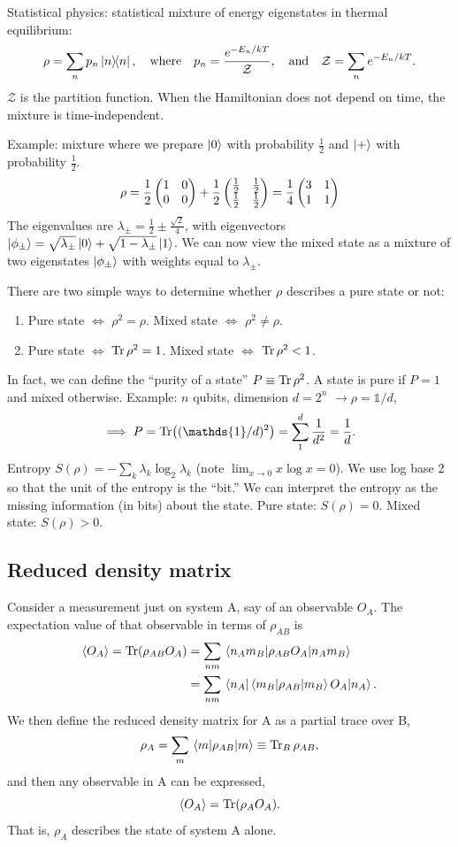 \documentclass[12pt]{article}
\newcommand*\id{\mathds{1}}
\begin{document}
Statistical physics: statistical mixture of energy eigenstates in thermal
equilibrium:
\[\rho = \sum_np_n\ketbra{n}, \qq{where}
p_n = \frac{e^{-E_n/kT}}{\mathcal{Z}}, \qq{and}
\mathcal{Z} = \sum_ne^{-E_n/kT}.\]
$\mathcal{Z}$ is the partition function. When the Hamiltonian does not depend
on time, the mixture is time-independent.

Example: mixture where we prepare $\ket{0}$ with probability $\frac{1}{2}$ and
$\ket{+}$ with probability $\frac{1}{2}$.
\[\rho = \frac{1}{2}\pmqty{1&0\\0&0}
+ \frac{1}{2}\pmqty{\frac{1}{2}&\frac{1}{2}\\\frac{1}{2}&\frac{1}{2}}
= \frac{1}{4}\pmqty{3&1\\1&1}\]
The eigenvalues are $\lambda_\pm = \frac{1}{2} \pm \frac{\sqrt{2}}{4}$, with
eigenvectors $\ket{\phi_\pm} = \sqrt{\lambda_\pm}\ket{0} +
\sqrt{1-\lambda_\pm}\ket{1}$. We can now view the mixed state as a mixture of
two eigenstates $\ket{\phi_\pm}$ with weights equal to $\lambda_\pm$.

There are two simple ways to determine whether $\rho$ describes a pure state
or not:
\begin{enumerate}
    \item Pure state $\Leftrightarrow$ $\rho^2 = \rho$.
        Mixed state $\Leftrightarrow$ $\rho^2 \neq \rho$.
    \item Pure state $\Leftrightarrow$ $\Tr\rho^2 = 1$.
        Mixed state $\Leftrightarrow$ $\Tr\rho^2 < 1$.
\end{enumerate}
In fact, we can define the ``purity of a state'' $P \equiv \Tr\rho^2$. A state
is pure if $P=1$ and mixed otherwise. Example: $n$ qubits, dimension $d = 2^n$
$\rightarrow \rho = \id/d$,
\[\implies P = \Tr((\id/d)^2) = \sum_{1}^d \frac{1}{d^2} = \frac{1}{d}.\]
Entropy $S(\rho) = -\sum_k \lambda_k\log_2\lambda_k$ (note $\lim_{x\rightarrow
0} x\log x = 0$). We use log base 2 so that the unit of the entropy is the
``bit.'' We can interpret the entropy as the missing information (in bits)
about the state. Pure state: $S(\rho) = 0$. Mixed state: $S(\rho) > 0$.

\subsection{Reduced density matrix}
Consider a measurement just on system A, say of an observable $O_A$. The
expectation value of that observable in terms of $\rho_{AB}$ is
\begin{align}
    \ev{O_A} = \Tr(\rho_{AB}O_A) &= \sum_{nm} \ev{\rho_{AB}O_A}{n_Am_B} \\
    &= \sum_{nm} \ev{\ev{\rho_{AB}}{m_B}O_A}{n_A}.
\end{align}
We then define the reduced density matrix for A as a partial trace over B,
\[\rho_A = \sum_m \ev{\rho_{AB}}{m} \equiv \Tr_B\rho_{AB},\]
and then any observable in A can be expressed,
\[\ev{O_A} = \Tr(\rho_AO_A).\]
That is, $\rho_A$ describes the state of system A alone.
\end{document}
